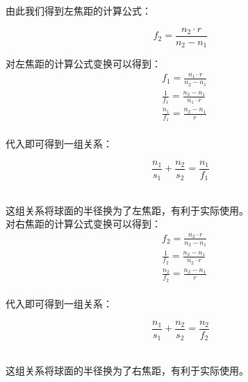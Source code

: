 \documentclass[UTF8]{ctexart}
\begin{document}
    由此我们得到左焦距的计算公式：
    \begin{large}
        \begin{equation*}
            f_2=\frac{n_2\cdot r}{n_2-n_1}
        \end{equation*}
    \end{large}

\newpage

    对左焦距的计算公式变换可以得到：
    \setcounter{equation}{0}
    \begin{align}
        &f_1=\frac{n_1\cdot r}{n_2-n_1}\\[5mm]
        &\frac{1}{f_1}=\frac{n_2-n_1}{n_1\cdot r}\\[5mm]
        &\frac{n_1}{f_1}=\frac{n_2-n_1}{r}
    \end{align}\\
    代入即可得到一组关系：
    \begin{large}
        \begin{equation*}
            \frac{n_1}{s_1}+\frac{n_2}{s_2}=\frac{n_1}{f_1}
        \end{equation*}
    \end{large}\\
    这组关系将球面的半径换为了左焦距，有利于实际使用。\\[16mm]
    对右焦距的计算公式变换可以得到：
    \begin{align}
        &f_2=\frac{n_2\cdot r}{n_2-n_1}\\[5mm]
        &\frac{1}{f_2}=\frac{n_2-n_1}{n_2\cdot r}\\[5mm]
        &\frac{n_2}{f_2}=\frac{n_2-n_1}{r}
    \end{align}\\
    代入即可得到一组关系：
    \begin{large}
        \begin{equation*}
            \frac{n_1}{s_1}+\frac{n_2}{s_2}=\frac{n_2}{f_2}
        \end{equation*}
    \end{large}\\
    这组关系将球面的半径换为了右焦距，有利于实际使用。

\newpage
\end{document}
